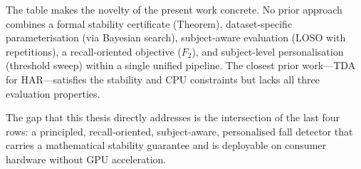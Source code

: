 The table makes the novelty of the present work concrete.  No prior approach combines
a formal stability certificate (Theorem), dataset-specific parameterisation (via
Bayesian search), subject-aware evaluation (LOSO with repetitions), a recall-oriented
objective ($F_2$), and subject-level personalisation (threshold sweep) within a
single unified pipeline.  The closest prior work---TDA for HAR---satisfies the
stability and CPU constraints but lacks all three evaluation properties.

The gap that this thesis directly addresses is the intersection of the last four
rows: a principled, recall-oriented, subject-aware, personalised fall detector that
carries a mathematical stability guarantee and is deployable on consumer hardware
without GPU acceleration.

